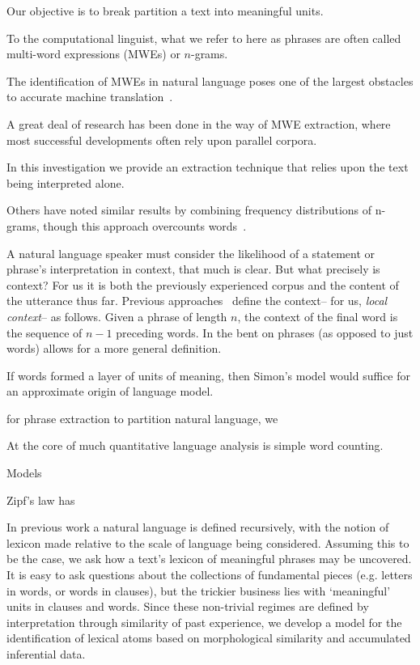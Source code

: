 Our objective is to break partition a text into meaningful units.

To the computational linguist, what we refer to here as phrases are
often called multi-word expressions (MWEs) or $n$-grams. 

The identification of MWEs in natural
language poses one of the largest obstacles to accurate machine
translation~\cite{sag????a}.

A great deal of research has been done in the
way of MWE extraction, where most successful developments often rely
upon parallel corpora.  

In this investigation we provide an extraction
technique that relies upon the text being interpreted alone.

Others have noted similar results by combining frequency distributions of n-grams,
though this approach overcounts words~\cite{ha2002a}.


A natural language speaker must consider the likelihood of a statement
or phrase's interpretation in context, that much is clear. 
But what precisely is context? 
For us it is both the previously experienced corpus and the content of
the utterance thus far. 
Previous approaches~\cite{piantadosi2011a} define the context-- for us,
\emph{local context}-- as follows. 
Given a phrase of length $n$, the context of the final word is the
sequence of $n-1$ preceding words.
In \cite{williams2013a} the bent on phrases (as opposed to just words)
allows for a more general definition. 


If words formed a layer of units of meaning,
then Simon's model would suffice for an approximate
origin of language model.


for phrase extraction to partition natural language,
we

At the core of much quantitative language analysis
is simple word counting.  

Models 

Zipf's law has 




In previous work \cite{Williams2013a} a natural language is defined
recursively, with the notion of lexicon made relative to the scale of
language being considered.
Assuming this to be the case, we ask how a text's lexicon of
meaningful phrases may be uncovered.
It is easy to ask questions about the collections of fundamental
pieces (e.g. letters in words, or words in clauses), but the trickier
business lies with `meaningful' units in clauses and words.
Since these non-trivial regimes are defined by interpretation through
similarity of past experience, we develop a model for the
identification of lexical atoms based on morphological similarity and
accumulated inferential data.




